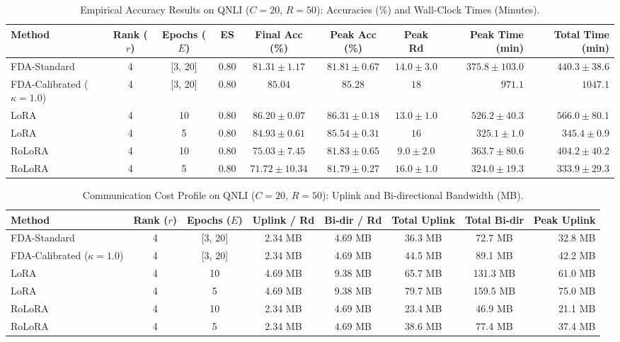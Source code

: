 \documentclass[10pt,a4paper]{article}
\begin{document}
\begin{table}[H]
\centering
\caption{Empirical Accuracy Results on QNLI ($C=20$, $R=50$): Accuracies (\%) and Wall-Clock Times (Minutes).}
\scriptsize
\setlength{\tabcolsep}{3.5pt}
\begin{tabular*}{\textwidth}{@{\extracolsep{\fill}}lccccccrr@{}}
\toprule
\textbf{Method} & \textbf{Rank ($r$)} & \textbf{Epochs ($E$)} & \textbf{ES} & \textbf{Final Acc (\%)} & \textbf{Peak Acc (\%)} & \textbf{Peak Rd} & \textbf{Peak Time (min)} & \textbf{Total Time (min)} \\
\midrule
FDA-Standard & 4 & [3, 20] & 0.80 & $81.31 \pm 1.17$ & $81.81 \pm 0.67$ & $14.0 \pm 3.0$ & $375.8 \pm 103.0$ & $440.3 \pm 38.6$ \\
FDA-Calibrated ($\kappa=1.0$) & 4 & [3, 20] & 0.80 & $85.04$ & $85.28$ & $18$ & $971.1$ & $1047.1$ \\
LoRA & 4 & 10 & 0.80 & $\mathbf{86.20 \pm 0.07}$ & $\mathbf{86.31 \pm 0.18}$ & $13.0 \pm 1.0$ & $526.2 \pm 40.3$ & $566.0 \pm 80.1$ \\
LoRA & 4 & 5 & 0.80 & $84.93 \pm 0.61$ & $85.54 \pm 0.31$ & $16$ & $\mathbf{325.1 \pm 1.0}$ & $345.4 \pm 0.9$ \\
RoLoRA & 4 & 10 & 0.80 & $75.03 \pm 7.45$ & $81.83 \pm 0.65$ & $9.0 \pm 2.0$ & $363.7 \pm 80.6$ & $404.2 \pm 40.2$ \\
RoLoRA & 4 & 5 & 0.80 & $71.72 \pm 10.34$ & $81.79 \pm 0.27$ & $16.0 \pm 1.0$ & $324.0 \pm 19.3$ & $333.9 \pm 29.3$ \\
\bottomrule
\end{tabular*}
\end{table}

\begin{table}[H]
\centering
\caption{Communication Cost Profile on QNLI ($C=20$, $R=50$): Uplink and Bi-directional Bandwidth (MB).}
\scriptsize
\setlength{\tabcolsep}{4.0pt}
\begin{tabular*}{\textwidth}{@{\extracolsep{\fill}}lccccccr@{}}
\toprule
\textbf{Method} & \textbf{Rank ($r$)} & \textbf{Epochs ($E$)} & \textbf{Uplink / Rd} & \textbf{Bi-dir / Rd} & \textbf{Total Uplink} & \textbf{Total Bi-dir} & \textbf{Peak Uplink} \\
\midrule
FDA-Standard & 4 & [3, 20] & 2.34 MB & 4.69 MB & 36.3 MB & 72.7 MB & 32.8 MB \\
FDA-Calibrated ($\kappa=1.0$) & 4 & [3, 20] & 2.34 MB & 4.69 MB & 44.5 MB & 89.1 MB & 42.2 MB \\
LoRA & 4 & 10 & 4.69 MB & 9.38 MB & 65.7 MB & 131.3 MB & 61.0 MB \\
LoRA & 4 & 5 & 4.69 MB & 9.38 MB & 79.7 MB & 159.5 MB & 75.0 MB \\
RoLoRA & 4 & 10 & 2.34 MB & 4.69 MB & 23.4 MB & 46.9 MB & 21.1 MB \\
RoLoRA & 4 & 5 & 2.34 MB & 4.69 MB & 38.6 MB & 77.4 MB & 37.4 MB \\
\bottomrule
\end{tabular*}
\end{table}
\end{document}
